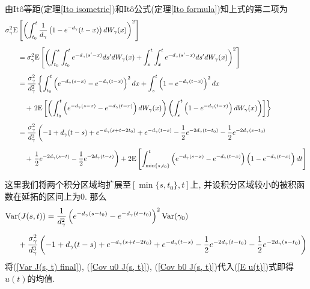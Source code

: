 \documentclass[notitlepage,cs4size,punct,oneside]{ctexrep}
\numberwithin{equation}{section}
\theoremstyle{mystyle}
\begin{document}
由It\^{o}等距(定理\ref{Ito isometric})和It\^{o}公式(定理\ref{Ito formula})知上式的第二项为
\[
\begin{split}
\sigma_\gamma^2\text{E}&\left[\left(\int_{t_0}^t \frac{1}{d_\gamma}\left(1-e^{-d_\gamma}(t-x)\right)dW_\gamma(x)\right)^2\right] \\[5pt]
&= \sigma_\gamma^2\text{E}\left[\left(\int_{t_0}^{s}\int_{t_0}^{t}e^{-d_\gamma(s'-x)}ds'dW_\gamma(x)+\int_s^t\int_x^t e^{-d_\gamma(s'-x)}ds'dW_\gamma(x)\right)^2\right] \\[5pt]
&= \frac{\sigma_\gamma^2}{d_\gamma^2}\left\{\int_{t_0}^t \left(e^{-d_\gamma(s-x)}-e^{-d_\gamma(t-x)}\right)^2dx+\int_{s}^t\left(1-e^{-d_\gamma(t-x)}\right)^2dx\right. \\[5pt]
&\quad+\left.2\text{E}\left[\left(\int_{t_0}^t \left(e^{-d_\gamma(s-x)}-e^{-d_\gamma(t-x)}\right)dW_\gamma(x)\right)\left(\int_{s}^t\left(1-e^{-d_\gamma(t-x)}\right)dW_\gamma(x)\right)\right]\right\} \\[5pt]
&= \frac{\sigma_\gamma^2}{d_\gamma^3}\left(-1+d_\gamma(t-s)+e^{-d_\gamma(s+t-2t_0)}+e^{-d_\gamma(t-s)}-\frac{1}{2}e^{-2d_\gamma(t-t_0)}-\frac{1}{2}e^{-2d_\gamma(s-t_0)}\right. \\[5pt]
&\quad+ \left.\frac{1}{2}e^{-2d_\gamma(s-t)}-\frac{1}{2}e^{-2d_\gamma(t-s)}\right) + 2\text{E}\left[\int_{\min\{s, t_0\}}^t\left(e^{-d_\gamma(s-x)}-e^{-d_\gamma(t-x)}\right)\left(1-e^{-d_\gamma(t-x)}\right)dt\right]
\end{split}
\]

这里我们将两个积分区域均扩展至$[\min\{s, t_0\}, t]$上, 并设积分区域较小的被积函数在延拓的区间上为0. 那么
\begin{equation} \label{Var J(s, t) final}
\begin{split}
\text{Var}&(J(s, t)) = \frac{1}{d_\gamma^2}\left(e^{-d_\gamma(s-t_0)}-e^{-d_\gamma(t-t_0)}\right)^2\text{Var}(\gamma_0) \\[5pt]
&+ \frac{\sigma_\gamma^2}{d_\gamma^3}\left(-1+d_\gamma(t-s)+e^{-d_\gamma(s+t-2t_0)}+e^{-d_\gamma(t-s)}-\frac{1}{2}e^{-2d_\gamma(t-t_0)}-\frac{1}{2}e^{-2d_\gamma(s-t_0)}\right) 
\end{split}
\end{equation}
将(\ref{Var J(s, t) final}), (\ref{Cov u0 J(s, t)}), (\ref{Cov b0 J(s, t)})代入(\ref{E u(t)})式即得$u(t)$的均值.
\end{document}
